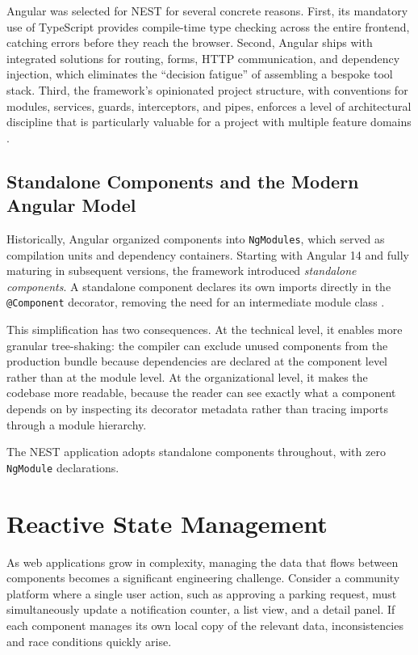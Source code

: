 Angular was selected for NEST for several concrete reasons. First, its mandatory use of TypeScript provides compile-time type checking across the entire frontend, catching errors before they reach the browser. Second, Angular ships with integrated solutions for routing, forms, HTTP communication, and dependency injection, which eliminates the ``decision fatigue'' of assembling a bespoke tool stack. Third, the framework's opinionated project structure, with conventions for modules, services, guards, interceptors, and pipes, enforces a level of architectural discipline that is particularly valuable for a project with multiple feature domains \cite{angularDocs}.

\subsection{Standalone Components and the Modern Angular Model}

Historically, Angular organized components into \texttt{NgModules}, which served as compilation units and dependency containers. Starting with Angular 14 and fully maturing in subsequent versions, the framework introduced \textit{standalone components}. A standalone component declares its own imports directly in the \texttt{@Component} decorator, removing the need for an intermediate module class \cite{angularDocs}.

This simplification has two consequences. At the technical level, it enables more granular tree-shaking: the compiler can exclude unused components from the production bundle because dependencies are declared at the component level rather than at the module level. At the organizational level, it makes the codebase more readable, because the reader can see exactly what a component depends on by inspecting its decorator metadata rather than tracing imports through a module hierarchy.

The NEST application adopts standalone components throughout, with zero \texttt{NgModule} declarations.

\section{Reactive State Management}
\label{sec:state-management}

As web applications grow in complexity, managing the data that flows between components becomes a significant engineering challenge. Consider a community platform where a single user action, such as approving a parking request, must simultaneously update a notification counter, a list view, and a detail panel. If each component manages its own local copy of the relevant data, inconsistencies and race conditions quickly arise.

